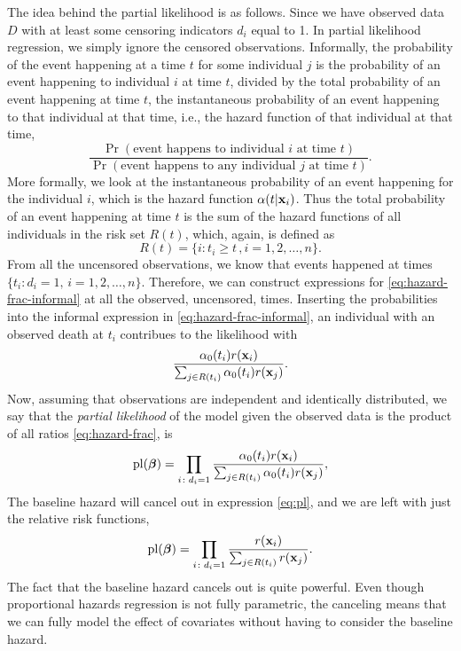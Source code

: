 The idea behind the partial likelihood is as follows. Since we have observed data $D$ with at least some censoring indicators $d_i$ equal to 1. In partial likelihood regression, we simply ignore the censored observations.
Informally, the probability of the event happening at a time $t$ for some individual $j$ is the probability of an event happening to individual $i$ at
time $t$, divided by the total probability of an event happening at time $t$,
the instantaneous probability of an event happening to that individual at that time, i.e., the hazard function of that individual at that time,
\begin{equation}\label{eq:hazard-frac-informal}
    \frac{\Pr(\text{event happens to individual }i\text{ at time }t)}{\Pr(\text{event happens to any individual }j\text{ at time }t)}.
\end{equation}
More formally, we look at the instantaneous probability of an event happening for the individual $i$, which is the hazard function $\alpha(t|\mathbf{x}_i)$.
Thus the total probability of an event happening at time $t$ is the sum of the hazard functions of all individuals in the risk set
$R(t)$, which, again, is defined as
\begin{equation*}
    R(t)=\{i\colon t_i\geq t\,,i=1,2,\ldots,n\}.
\end{equation*}
From all the uncensored observations, we know that events happened at times $\{t_i\colon d_i=1,\,i=1,2,\ldots,n\}$. Therefore, we can construct expressions for \eqref{eq:hazard-frac-informal} at all the observed, uncensored, times.
Inserting the probabilities into the informal expression in \eqref{eq:hazard-frac-informal}, an individual with an observed death at $t_i$ 
contribues to the likelihood with
\begin{equation}\label{eq:hazard-frac}
    \frac{\alpha_0(t_i)r(\mathbf{x}_i)}{\sum_{j\in R(t_i)} \alpha_0(t_i)r(\mathbf{x}_j)}.
\end{equation}
Now, assuming that observations are independent and identically distributed, we say that the \textit{partial likelihood} of the model
given the observed data is the product of all ratios \eqref{eq:hazard-frac}, is
\begin{equation}\label{eq:pl}
    \operatorname{pl}(\boldsymbol{\beta})=\prod_{i\colon d_i=1}\frac{\alpha_0(t_i)r(\mathbf{x}_i)}{\sum_{j\in R(t_i)} \alpha_0(t_i)r(\mathbf{x}_j)},
\end{equation}
The baseline hazard will cancel out in expression \eqref{eq:pl}, and we are left with just the relative risk functions,
\begin{equation*}
    \operatorname{pl}(\boldsymbol{\beta})=\prod_{i\colon d_i=1}\frac{r(\mathbf{x}_i)}{\sum_{j\in R(t_i)}r(\mathbf{x}_j)}.
\end{equation*}
The fact that the baseline hazard cancels out is quite powerful. Even though proportional hazards regression is not fully parametric,
the canceling means that we can fully model the effect of covariates without having to consider the baseline hazard.

